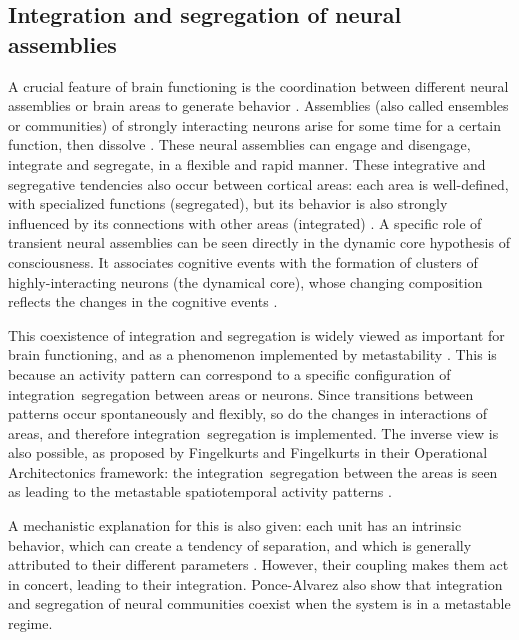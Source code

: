 \documentclass[preprint,superscriptaddress,showpacs,amsmath,amssymb,aps,pre,floatfix]{revtex4-1}
\theoremstyle{definition}
\begin{document}
\subsection{Integration and segregation of neural assemblies}
\label{sec:role:int-seg}
A crucial feature of brain functioning is the coordination between different neural assemblies or brain areas to generate behavior \cite{tognoli_2014, alderson_2020}. Assemblies (also called ensembles or communities) of strongly interacting neurons arise for some time for a certain function, then dissolve \cite{kringelbach_2015, tognoli_2014, cordova-palomera_2017, hellyer_2014, tognoli_2014a, shanahan_2010, kahana_2006}. These neural assemblies can engage and disengage, integrate and segregate, in a flexible and rapid manner. These integrative and segregative tendencies also occur between cortical areas: each area is well-defined, with specialized functions (segregated), but its behavior is also strongly influenced by its connections with other areas (integrated) \cite{fingelkurts_2004}. A specific role of transient neural assemblies can be seen directly in the dynamic core hypothesis of consciousness. It associates cognitive events with the formation of clusters of highly-interacting neurons (the dynamical core), whose changing composition reflects the changes in the cognitive events \cite{fingelkurts_2006timing, tononi_1998consciousness, werner_2007}. 

This coexistence of integration and segregation is widely viewed as important for brain functioning, and as a phenomenon implemented by metastability \cite{tognoli_2014, fingelkurts_2008}. This is because an activity pattern can correspond to a specific configuration of integration~segregation between areas or neurons. Since transitions between patterns occur spontaneously and flexibly, so do the changes in interactions of areas, and therefore integration~segregation is implemented. The inverse view is also possible, as proposed by Fingelkurts and Fingelkurts in their Operational Architectonics framework: the integration~segregation between the areas is seen as leading to the metastable spatiotemporal activity patterns \cite{fingelkurts_2008}.

A mechanistic explanation for this is also given: each unit has an intrinsic behavior, which can create a tendency of separation, and which is generally attributed to their different parameters \cite{tognoli_2014, fingelkurts_2008}. However, their coupling makes them act in concert, leading to their integration. Ponce-Alvarez \cite{ponce-alvarez_2015} also show that integration and segregation of neural communities coexist when the system is in a metastable regime. 
\end{document}
